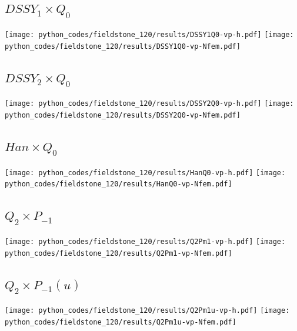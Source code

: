\subsection*{$DSSY_1\times Q_0$}
\begin{center}
\texttt{[image: python\_codes/fieldstone\_120/results/DSSY1Q0-vp-h.pdf]}
\texttt{[image: python\_codes/fieldstone\_120/results/DSSY1Q0-vp-Nfem.pdf]}
\end{center}

\subsection*{$DSSY_2\times Q_0$}
\begin{center}
\texttt{[image: python\_codes/fieldstone\_120/results/DSSY2Q0-vp-h.pdf]}
\texttt{[image: python\_codes/fieldstone\_120/results/DSSY2Q0-vp-Nfem.pdf]}
\end{center}

\subsection*{$Han\times Q_0$}
\begin{center}
\texttt{[image: python\_codes/fieldstone\_120/results/HanQ0-vp-h.pdf]}
\texttt{[image: python\_codes/fieldstone\_120/results/HanQ0-vp-Nfem.pdf]}
\end{center}

\subsection*{$Q_2\times P_{-1}$}
\begin{center}
\texttt{[image: python\_codes/fieldstone\_120/results/Q2Pm1-vp-h.pdf]}
\texttt{[image: python\_codes/fieldstone\_120/results/Q2Pm1-vp-Nfem.pdf]}
\end{center}

\subsection*{$Q_2\times P_{-1}(u)$}
\begin{center}
\texttt{[image: python\_codes/fieldstone\_120/results/Q2Pm1u-vp-h.pdf]}
\texttt{[image: python\_codes/fieldstone\_120/results/Q2Pm1u-vp-Nfem.pdf]}
\end{center}

